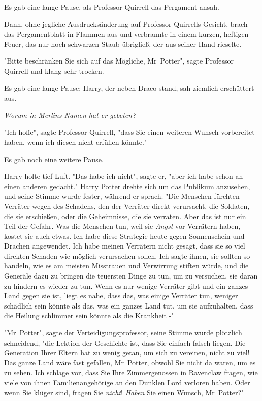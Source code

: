 {Es gab eine lange Pause, als Professor Quirrell das Pergament ansah.

Dann, ohne jegliche Ausdrucksänderung auf Professor Quirrells Gesicht, brach das Pergamentblatt in Flammen aus und verbrannte in einem kurzen, heftigen Feuer, das nur noch schwarzen Staub übrigließ, der aus seiner Hand rieselte.

"Bitte beschränken Sie sich auf das Mögliche, Mr~Potter", sagte Professor Quirrell und klang sehr trocken.

Es gab eine lange Pause; Harry, der neben Draco stand, sah ziemlich erschüttert aus.

\emph{Worum in Merlins Namen hat er gebeten?}

"Ich hoffe", sagte Professor Quirrell, "dass Sie einen weiteren Wunsch vorbereitet haben, wenn ich diesen nicht erfüllen könnte."

Es gab noch eine weitere Pause.

Harry holte tief Luft. "Das habe ich nicht", sagte er, "aber ich habe schon an einen anderen gedacht." Harry Potter drehte sich um das Publikum anzusehen, und seine Stimme wurde fester, während er sprach. "Die Menschen fürchten Verräter wegen des Schadens, den der Verräter direkt verursacht, die Soldaten, die sie erschießen, oder die Geheimnisse, die sie verraten. Aber das ist nur ein Teil der Gefahr. Was die Menschen tun, weil sie \emph{Angst} vor Verrätern haben, kostet sie auch etwas. Ich habe diese Strategie heute gegen Sonnenschein und Drachen angewendet. Ich habe meinen Verrätern nicht gesagt, dass sie so viel direkten Schaden wie möglich verursachen sollen. Ich sagte ihnen, sie sollten so handeln, wie es am meisten Misstrauen und Verwirrung stiften würde, und die Generäle dazu zu bringen die teuersten Dinge zu tun, um zu versuchen, sie daran zu hindern es wieder zu tun. Wenn es nur wenige Verräter gibt und ein ganzes Land gegen sie ist, liegt es nahe, dass das, was einige Verräter tun, weniger schädlich sein könnte als das, was ein ganzes Land tut, um sie aufzuhalten, dass die Heilung schlimmer sein könnte als die Krankheit -"

"Mr~Potter", sagte der Verteidigungsprofessor, seine Stimme wurde plötzlich schneidend, "die Lektion der Geschichte ist, dass Sie einfach falsch liegen. Die Generation Ihrer Eltern hat zu wenig getan, um sich zu vereinen, nicht zu viel! Das ganze Land wäre fast gefallen, Mr~Potter, obwohl Sie nicht da waren, um es zu sehen. Ich schlage vor, dass Sie Ihre Zimmergenossen in Ravenclaw fragen, wie viele von ihnen Familienangehörige an den Dunklen Lord verloren haben. Oder wenn Sie klüger sind, fragen Sie \emph{nicht}! \emph{Haben} Sie einen Wunsch, Mr~Potter?"

}
